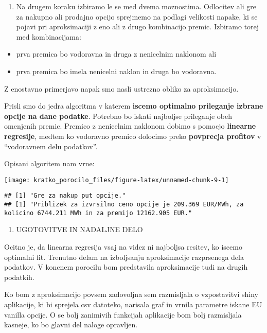 \documentclass[
]{article}
\providecommand{\tightlist}{%
  \setlength{\itemsep}{0pt}\setlength{\parskip}{0pt}}
\begin{document}
\begin{enumerate}
\def\labelenumi{\arabic{enumi}.}
\setcounter{enumi}{1}
\tightlist
\item
  Na drugem koraku izbiramo le se med dvema moznostima. Odlocitev ali
  gre za nakupno ali prodajno opcijo sprejmemo na podlagi velikosti
  napake, ki se pojavi pri aproksimaciji z eno ali z drugo kombinacijo
  premic. Izbiramo torej med kombinacijama:
\end{enumerate}

\begin{itemize}
\tightlist
\item
  prva premica bo vodoravna in druga z nenicelnim naklonom ali
\item
  prva premica bo imela nenicelni naklon in druga bo vodoravna.
\end{itemize}

Z enostavno primerjavo napak smo nasli ustrezno obliko za aproksimacijo.

Prisli smo do jedra algoritma v katerem \textbf{iscemo optimalno
prileganje izbrane opcije na dane podatke}. Potrebno bo iskati najboljse
prileganje obeh omenjenih premic. Premico z nenicelnim naklonom dobimo s
pomocjo \textbf{linearne regresije}, medtem ko vodoravno premico
dolocimo preko \textbf{povprecja profitov} v ``vodoravnem delu
podatkov''.

Opisani algoritem nam vrne:

\begin{center}\texttt{[image: kratko\_porocilo\_files/figure-latex/unnamed-chunk-9-1]} \end{center}

\begin{verbatim}
## [1] "Gre za nakup put opcije."
## [1] "Priblizek za izvrsilno ceno opcije je 209.369 EUR/MWh, za kolicino 6744.211 MWh in za premijo 12162.905 EUR."
\end{verbatim}

\begin{enumerate}
\def\labelenumi{\arabic{enumi}.}
\setcounter{enumi}{3}
\tightlist
\item
  UGOTOVITVE IN NADALJNE DELO
\end{enumerate}

Ocitno je, da linearna regresija vsaj na videz ni najboljsa resitev, ko
iscemo optimalni fit. Trenutno delam na izboljsanju aproksimacije
razprsenega dela podatkov. V koncnem porocilu bom predstavila
aproksimacije tudi na drugih podatkih.

Ko bom z aproksimacijo povsem zadovoljna sem razmisljala o vzpostavitvi
shiny aplikacije, ki bi sprejela csv datoteko, narisala graf in vrnila
parametre iskane EU vanilla opcije. O se bolj zanimivih funkcijah
aplikacije bom bolj razmisljala kasneje, ko bo glavni del naloge
opravljen.
\end{document}
